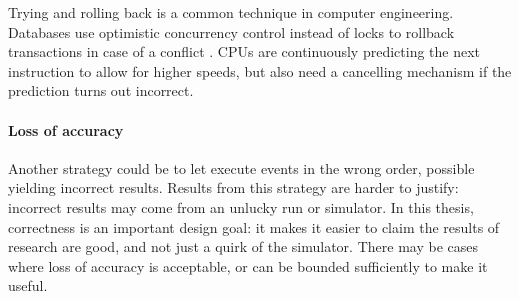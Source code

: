 Trying and rolling back is a common technique in computer engineering.
Databases use optimistic concurrency control instead of locks to rollback transactions in case of a conflict \cite{dragojevic_no_2015}.
CPUs are continuously predicting the next instruction to allow for higher speeds, but also need a cancelling mechanism if the prediction turns out incorrect.

\paragraph{Loss of accuracy}
Another strategy could be to let execute events in the wrong order, possible yielding incorrect results.
Results from this strategy are harder to justify: incorrect results may come from an unlucky run or simulator.
In this thesis, correctness is an important design goal: it makes it easier to claim the results of research are good, and not just a quirk of the simulator.
There may be cases where loss of accuracy is acceptable, or can be bounded sufficiently to make it useful.
